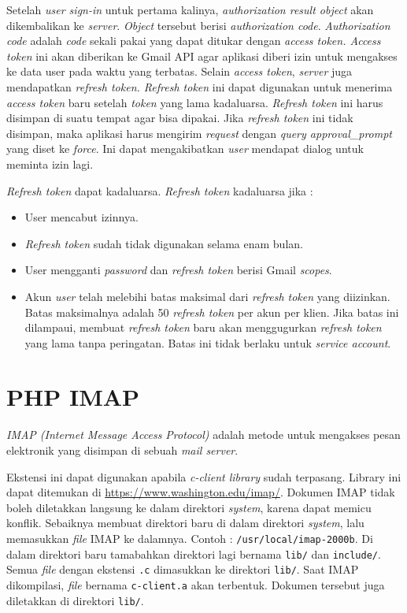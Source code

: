 Setelah \textit{user sign-in} untuk pertama kalinya, \textit{authorization result object} akan dikembalikan ke \textit{server}. \textit{Object} tersebut berisi \textit{authorization code}. \textit{Authorization code} adalah \textit{code} sekali pakai yang dapat ditukar dengan \textit{access token. Access token} ini akan diberikan ke Gmail API agar aplikasi diberi izin untuk mengakses ke data user pada waktu yang terbatas. Selain \textit{access token}, \textit{server} juga mendapatkan \textit{refresh token. Refresh token} ini dapat digunakan untuk menerima \textit{access token} baru setelah \textit{token} yang lama kadaluarsa. \textit{Refresh token} ini harus disimpan di suatu tempat agar bisa dipakai. Jika \textit{refresh token} ini tidak disimpan, maka aplikasi harus mengirim \textit{request} dengan \textit{query approval\_prompt} yang diset ke \textit{force}. Ini dapat mengakibatkan \textit{user} mendapat dialog untuk meminta izin lagi.

\textit{Refresh token} dapat kadaluarsa. \textit{Refresh token} kadaluarsa jika :
\begin{itemize}
\item User mencabut izinnya.
\item \textit{Refresh token} sudah tidak digunakan selama enam bulan.
\item User mengganti \textit{password} dan \textit{refresh token} berisi Gmail \textit{scopes}.
\item Akun \textit{user} telah melebihi batas maksimal dari \textit{refresh token} yang diizinkan. Batas maksimalnya adalah 50 \textit{refresh token} per akun per klien. Jika batas ini dilampaui, membuat \textit{refresh token} baru akan menggugurkan \textit{refresh token} yang lama tanpa peringatan. Batas ini tidak berlaku untuk \textit{service account}.
\end{itemize}

\section{PHP IMAP ~\cite{php-imap}}
\label{sec:PHPIMAP}
\textit{IMAP (Internet Message Access Protocol)} adalah metode untuk mengakses pesan elektronik yang disimpan di sebuah \textit{mail server}.

Ekstensi ini dapat digunakan apabila \textit{c-client library} sudah terpasang. Library ini dapat ditemukan di \url{https://www.washington.edu/imap/}. Dokumen IMAP tidak boleh diletakkan langsung ke dalam direktori \textit{system}, karena dapat memicu konflik. Sebaiknya membuat direktori baru di dalam direktori \textit{system}, lalu memasukkan \textit{file} IMAP ke dalamnya. Contoh : \texttt{/usr/local/imap-2000b}. Di dalam direktori baru tamabahkan direktori lagi bernama \texttt{lib/} dan \texttt{include/}. Semua \textit{file} dengan ekstensi \texttt{.c} dimasukkan ke direktori \texttt{lib/}. Saat IMAP dikompilasi, \textit{file} bernama \texttt{c-client.a} akan terbentuk. Dokumen tersebut juga diletakkan di direktori \texttt{lib/}.

